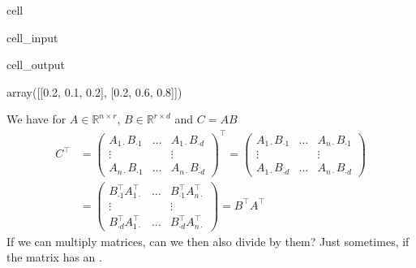 \documentclass[letterpaper,10pt,english]{jupyterBook}
\begin{document}
\begin{sphinxuseclass}{cell}\begin{sphinxVerbatimInput}

\begin{sphinxuseclass}{cell_input}
\begin{sphinxVerbatim}[commandchars=\\\{\}]
\end{sphinxVerbatim}

\end{sphinxuseclass}\end{sphinxVerbatimInput}
\begin{sphinxVerbatimOutput}

\begin{sphinxuseclass}{cell_output}
\begin{sphinxVerbatim}[commandchars=\\\{\}]
array([[0.2, 0.1, 0.2],
       [0.2, 0.6, 0.8]])
\end{sphinxVerbatim}

\end{sphinxuseclass}\end{sphinxVerbatimOutput}

\end{sphinxuseclass}
\sphinxAtStartPar
We have for \(A\in \mathbb{R}^{n\times r}\),  \(B\in\mathbb{R}^{r\times d}\) and \(C=AB\)
\begin{align*}
    C^\top&= \begin{pmatrix}
    A_{1\cdot}B_{\cdot 1}&\ldots & A_{1\cdot}B_{\cdot d}\\
    \vdots & & \vdots\\
    A_{n\cdot}B_{\cdot 1}&\ldots & A_{n\cdot}B_{\cdot d}
    \end{pmatrix}^\top = 
    \begin{pmatrix}
    A_{1\cdot}B_{\cdot 1}&\ldots & A_{n\cdot}B_{\cdot 1}\\
    \vdots & & \vdots\\
    A_{1\cdot}B_{\cdot d}&\ldots & A_{n\cdot}B_{\cdot d}
    \end{pmatrix}
    \\
    &= \begin{pmatrix}
    B_{\cdot 1}^\top A_{1\cdot}^\top&\ldots & B_{\cdot 1}^\top A_{n\cdot}^\top\\
    \vdots & & \vdots\\
    B_{\cdot d}^\top A_{1\cdot}^\top &\ldots & B_{\cdot d}^\top A_{n\cdot}^\top 
    \end{pmatrix}= B^\top A^\top
\end{align*}
\sphinxAtStartPar
If we can multiply matrices, can we then also divide by them?
Just sometimes, if the matrix has an .
\end{document}
